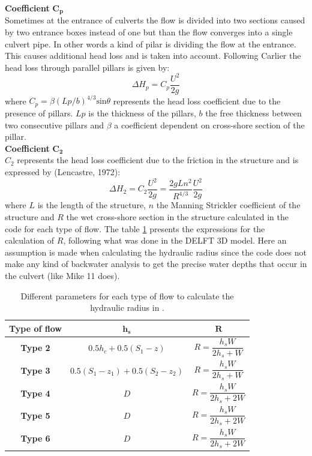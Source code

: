 \textbf{Coefficient} $\mathbf{C_p}$\\
Sometimes at the entrance of culverts the flow is divided into two sections
caused by two entrance boxes instead of one but than the flow converges into
a single culvert pipe. In other words a kind of pilar is dividing the flow at the entrance.
This causes additional head loss and is taken into account.
Following Carlier \cite{Carlier1972} the head loss through parallel pillars is given by:
\begin{equation}
\Delta H_p = C_p \dfrac{U^2}{2g}
\end{equation}
where $C_p=\beta \left(Lp/b\right)^{4/3} \text{sin} \theta$  represents the head
loss coefficient due to the presence of pillars. $Lp$ is the thickness of the pillars, $b$
the free thickness between two consecutive pillars and $\beta$
a coefficient dependent on cross-shore section of the pillar.\\

\textbf{Coefficient} $\mathbf{C_2}$\\
$C_2$ represents the head loss coefficient due to the friction in the structure
and is expressed by (Lencastre, 1972):
\begin{equation}
\Delta H_2 = C_2  \dfrac{U^2}{2g} = \dfrac{2gLn^2}{R^{4/3}}\dfrac{U^2}{2g}
\end{equation}
where $L$ is the length of the structure, $n$ the Manning Strickler coefficient
of the structure and $R$ the wet cross-shore section in the structure calculated
in the code for each type of flow.
The table \ref{tab:culvert_tab3} presents the expressions for the calculation of $R$,
following what was done in the DELFT 3D model.
Here an assumption is made when calculating the hydraulic radius since the
code does not make any kind of backwater analysis to get the
precise water depths that occur in the culvert (like Mike 11 does).
\begin{table}[H]
\caption{Different parameters for each type of flow to calculate the hydraulic radius in .}
\label{tab:culvert_tab3}
\begin{center}\begin{tabular}{|c|c|c|}
\hline
\textbf{Type of flow} & $\mathbf{h_s}$ & $\mathbf{R}$ \\
\hline
\textbf{Type 2} & $0.5 h_c + 0.5(S_1-z)$    & $R = \dfrac{h_s W}{2 h_s+W}$ \\
\hline
\textbf{Type 3} & $0.5 (S_1 - z_1) + 0.5(S_2-z_2)$    & $R = \dfrac{h_s W}{2 h_s+W}$ \\
\hline
\textbf{Type 4} & $D$    & $R = \dfrac{h_s W}{2 h_s+2W}$ \\
\hline
\textbf{Type 5} & $D$    & $R = \dfrac{h_s W}{2 h_s+2W}$ \\
\hline
\textbf{Type 6} & $D$    & $R = \dfrac{h_s W}{2 h_s+2W}$ \\
\hline
\end{tabular}\end{center}
\end{table}

